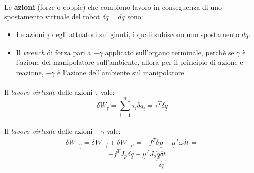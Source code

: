 \paragraph{}
Le \textbf{azioni} (forze o coppie) che compiono lavoro in conseguenza di uno spostamento virtuale del robot $\delta \underline{q} = d\underline{q}$ sono:
\begin{itemize}
	\item Le azioni $\underline{\tau}$ degli attuatori sui giunti, i quali subiscono uno spostamento $d \underline{q}$.
	\item Il \emph{wrench} di forza pari a $-\gamma$ applicato sull'organo terminale, perchè se $\gamma$ è l'azione del manipolatore sull'ambiente, allora per il principio di azione e reazione, $-\gamma$ è l'azione dell'ambiente sul manipolatore.
\end{itemize}

\paragraph{}
Il \emph{lavoro virtuale} delle azioni $\underline{\tau}$ vale:
\begin{equation}
	\delta W_{\underline{\tau}} = \sum_{i = 1}^n \tau_i \delta q_i = \underline{\tau}^T \delta \underline{q}
\end{equation}

\paragraph{}
Il \emph{lavoro virtuale} delle azioni $-\underline{\gamma}$ vale:
\begin{equation*}
	\delta W_{- \underline{\gamma}} = \delta W_{- \underline{f}} + \delta W_{- \underline{\mu}} = - \underline{f}^T \delta \underline{p} - \underline{\mu}^T \underline{\omega} \delta t =
\end{equation*}
\begin{equation}
	= - \underline{f}^T J_p \delta \underline{q} - \underline{\mu}^T J_o \underbrace{\underline{\dot{q}} \delta t}_{\delta \underline{q}}  
\end{equation}

